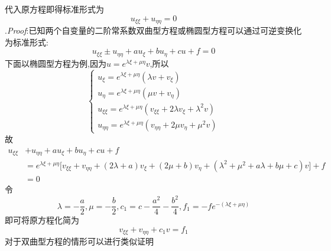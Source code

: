 代入原方程即得标准形式为
\[u_{\xi\xi}+u_{\eta\eta}=0\]
.\textit{Proof}:已知两个自变量的二阶常系数双曲型方程或椭圆型方程可以通过可逆变换化为标准形式:
\[u_{\xi\xi}\pm u_{\eta\eta}+au_{\xi}+bu_{\eta}+cu+f=0\]
下面以椭圆型方程为例,因为$u=e^{\lambda\xi+\mu\eta}v$,所以
\[\begin{cases}
u_{\xi}=e^{\lambda\xi+\mu\eta}(\lambda v+v_{\xi})\\
u_{\eta}=e^{\lambda\xi+\mu\eta}(\mu v+v_{\eta})\\
u_{\xi\xi}=e^{\lambda\xi+\mu\eta}(v_{\xi\xi}+2\lambda v_{\xi}+\lambda^2v)\\
u_{\eta\eta}=e^{\lambda\xi+\mu\eta}(v_{\eta\eta}+2\mu v_{\eta}+\mu^2v)
\end{cases}\]
故
\[\begin{split}
u_{\xi\xi}&+u_{\eta\eta}+au_{\xi}+bu_{\eta}+cu+f\\
&=e^{\lambda\xi+\mu\eta}\big[v_{\xi\xi}+v_{\eta\eta}+(2\lambda+a)v_{\xi}+(2\mu+b)v_{\eta}+(\lambda^2+\mu^2+a\lambda+b\mu+c)v\big]+f\\
&=0
\end{split}\]
令\[\lambda=-\frac{a}{2},\mu=-\frac{b}{2},c_1=c-\frac{a^2}{4}-\frac{b^2}{4},f_1=-fe^{-(\lambda\xi+\mu\eta)}\]
即可将原方程化简为
\[v_{\xi\xi}+v_{\eta\eta}+c_1v=f_1\]
对于双曲型方程的情形可以进行类似证明\\
